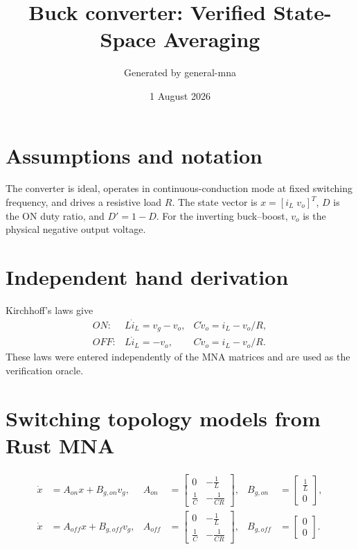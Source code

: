 \documentclass[11pt]{article}
\title{Buck converter: Verified State-Space Averaging}
\author{Generated by general-mna}
\date{1 August 2026}
\begin{document}
\maketitle

\section*{Assumptions and notation}
The converter is ideal, operates in continuous-conduction mode at fixed
switching frequency, and drives a resistive load $R$. The state vector is
$x=[i_L\;v_o]^T$, $D$ is the ON duty ratio, and $D'=1-D$. For the inverting
buck--boost, $v_o$ is the physical negative output voltage.

\section*{Independent hand derivation}
Kirchhoff's laws give
\begin{align}
ON: & L\dot i_L=v_g-v_o, & C\dot v_o=i_L-v_o/R,\\
OFF: & L\dot i_L=-v_o, & C\dot v_o=i_L-v_o/R.
\end{align}
These laws were entered independently of the MNA matrices and are used as the
verification oracle.

\section*{Switching topology models from Rust MNA}
\begin{align}
\dot x &= A_{on}x+B_{g,on}v_g,
&A_{on}&=\left[\begin{matrix}0 & - \frac{1}{L}\\\frac{1}{C} & - \frac{1}{C R}\end{matrix}\right],
&B_{g,on}&=\left[\begin{matrix}\frac{1}{L}\\0\end{matrix}\right],\\
\dot x &= A_{off}x+B_{g,off}v_g,
&A_{off}&=\left[\begin{matrix}0 & - \frac{1}{L}\\\frac{1}{C} & - \frac{1}{C R}\end{matrix}\right],
&B_{g,off}&=\left[\begin{matrix}0\\0\end{matrix}\right].
\end{align}
\end{document}
